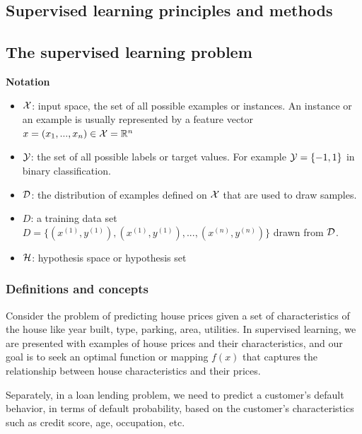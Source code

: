 \begin{refsection}
	\startcontents[chapters]	
\chapter{Supervised learning principles and methods}\label{ch:statistical-learning}
\section{The supervised learning problem}
\begin{mdframed}
	\textbf{Notation}\cite[12]{mohri2012foundations}
	\begin{itemize}
		\item $\mathcal{X}$: input space, the set of all possible examples or instances. An instance or an example is usually represented by a feature vector $x = (x_1,...,x_n) \in \mathcal{X} = \mathbb{R}^n$
		\item $\mathcal{Y}$: the set of all possible labels or target values. For example $\mathcal{Y}=\{-1,1\}$ in binary classification.
		\item $\mathcal{D}$: the distribution of examples defined on $\mathcal{X}$ that are used to draw samples.
		\item $D$: a training data set $D = \{(x^{(1)}, y^{(1)}), (x^{(1)}, y^{(1)}), ..., (x^{(n)}, y^{(n)})\}$ drawn from $\mathcal{D}$.
		\item $\mathcal{H}$: hypothesis space or hypothesis set
	\end{itemize}
\end{mdframed}

\subsection{Definitions and concepts}




Consider the problem of predicting house prices given a set of characteristics of the house like year built, type, parking, area, utilities. In supervised learning, we are presented with examples of house prices and their characteristics, and our goal is to seek an optimal function or mapping $f(x)$ that captures the relationship between house characteristics and their prices.

Separately, in a loan lending problem, we need to predict a customer's default behavior, in terms of default probability, based on the customer's characteristics such as credit score, age, occupation, etc.





\end{refsection}
